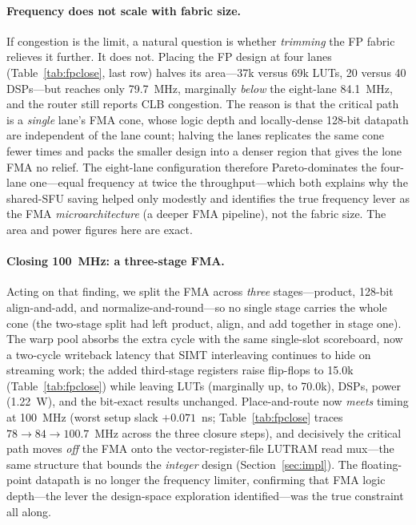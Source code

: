 \documentclass[conference]{IEEEtran}
\begin{document}
\paragraph{Frequency does not scale with fabric size.} If congestion is the limit,
a natural question is whether \emph{trimming} the FP fabric relieves it further. It
does not. Placing the FP design at four lanes (Table~\ref{tab:fpclose}, last row)
halves its area---37k versus 69k LUTs, 20 versus 40 DSPs---but reaches only 79.7~MHz,
marginally \emph{below} the eight-lane 84.1~MHz, and the router still reports CLB
congestion. The reason is that the critical path is a \emph{single} lane's FMA cone,
whose logic depth and locally-dense 128-bit datapath are independent of the lane
count; halving the lanes replicates the same cone fewer times and packs the smaller
design into a denser region that gives the lone FMA no relief. The eight-lane
configuration therefore Pareto-dominates the four-lane one---equal frequency at
twice the throughput---which both explains why the shared-SFU saving helped only
modestly and identifies the true frequency lever as the FMA \emph{microarchitecture}
(a deeper FMA pipeline), not the fabric size. The area and power figures here are
exact.

\paragraph{Closing 100~MHz: a three-stage FMA.} Acting on that finding, we split the
FMA across \emph{three} stages---product, 128-bit align-and-add, and
normalize-and-round---so no single stage carries the whole cone (the two-stage split
had left product, align, and add together in stage one). The warp pool absorbs the
extra cycle with the same single-slot scoreboard, now a two-cycle writeback latency
that SIMT interleaving continues to hide on streaming work; the added third-stage
registers raise flip-flops to 15.0k (Table~\ref{tab:fpclose}) while leaving LUTs
(marginally up, to 70.0k), DSPs, power (1.22~W), and the bit-exact results unchanged.
Place-and-route now \emph{meets} timing at 100~MHz (worst setup slack
$+0.071$~ns; Table~\ref{tab:fpclose} traces $78\rightarrow84\rightarrow100.7$~MHz
across the three closure steps), and decisively the critical path moves \emph{off}
the FMA onto the vector-register-file LUTRAM read mux---the same structure that
bounds the \emph{integer} design (Section~\ref{sec:impl}). The floating-point
datapath is no longer the frequency limiter, confirming that FMA logic depth---the
lever the design-space exploration identified---was the true constraint all along.
\end{document}
